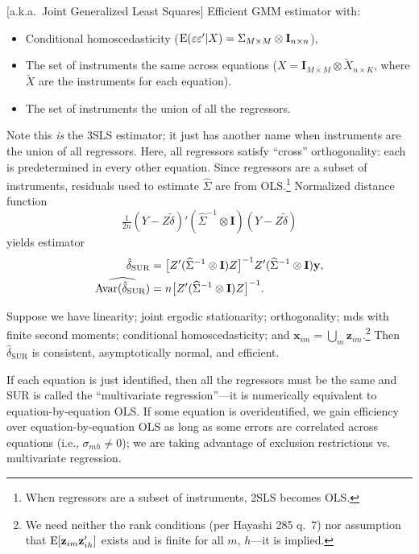 \documentclass[8pt,letterpaper, landscape]{extarticle} %
\newcommand{\mx}{\ensuremath{\mathbf{x}}}
\newcommand{\mI}{\ensuremath{\mathbf{I}}}
\begin{document}
\begin{multicols}{3}
\begin{description}
 [a.k.a.\ Joint Generalized Least Squares]
Efficient GMM estimator with:
\begin{itemize}
\item Conditional homoscedasticity ($ \E (\epsilon \epsilon' | X) = \Sigma_{M \times M} \otimes \mI_{n \times n} $),
\item The set of instruments the same across equations ($ X = \mI_{M \times M} \otimes \tilde{X}_{n \times K} $, where $ \tilde{X} $ are the instruments for each equation).
\item The set of instruments the union of all the regressors.
\end{itemize}
Note this \textit{is} the 3SLS estimator; it just has another name when instruments are the union of all regressors. Here, all regressors satisfy ``cross'' orthogonality: each is predetermined in every other equation. Since regressors are a subset of instruments, residuals used to estimate $ \widehat{\Sigma} $ are from OLS.\footnote{When regressors are a subset of instruments, 2SLS becomes OLS.} Normalized distance function
\[ \tfrac{1}{2n}(Y - Z \tilde{\delta})' (\widehat{\Sigma}^{-1} \otimes \mI) (Y - Z \tilde{\delta}) \]
yields estimator
\begin{align*}
\hat{\delta}_{\text{SUR}} &= \bigl [ Z' (\widehat{\Sigma}^{-1} \otimes \mI) Z \bigr ]^{-1} Z' (\widehat{\Sigma}^{-1} \otimes \mI) \mathbf{y} , \\
\widehat{\Avar (\hat{\delta}_{\text{SUR}})} &= n \bigl [ Z' (\widehat{\Sigma}^{-1} \otimes \mI) Z \bigr ]^{-1} .
\end{align*}

Suppose we have linearity; joint ergodic stationarity; orthogonality; mds with finite second moments; conditional homoscedasticity; and $ \mx_{im} = \bigcup_{m} \mathbf{z}_{im} $.\footnote{We need neither the rank conditions (per Hayashi 285 q.~7) nor assumption that $ \operatorname{E} [\mathbf{z}_{im} \mathbf{z}_{ih}'] $ exists and is finite for all $ m $, $ h $---it is implied.} Then $ \hat{\delta}_{\text{SUR}} $ is consistent, asymptotically normal, and efficient.

If each equation is just identified, then all the regressors must be the same and SUR is called the ``multivariate regression''---it is numerically equivalent to equation-by-equation OLS. If some equation is overidentified, we gain efficiency over equation-by-equation OLS as long as some errors are correlated across equations (i.e., $ \sigma_{mh} \neq 0 $); we are  taking advantage of exclusion restrictions vs. multivariate regression.


\end{description}
\end{multicols}
\end{document}
